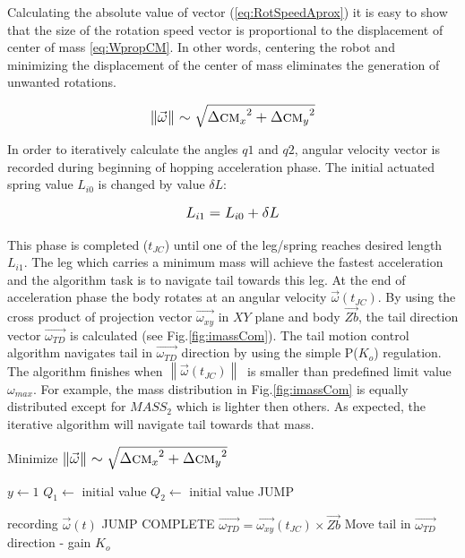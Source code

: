Calculating the absolute value of vector (\ref{eq:RotSpeedAprox}) it is easy to show that the size of the rotation speed vector is proportional to the displacement of center of mass \eqref{eq:WpropCM}. In other words, centering the robot and minimizing the displacement of the center of mass eliminates the generation of unwanted rotations. 

\begin{equation}\label{eq:WpropCM}
\left \| \vec{\omega} \right \|\sim \sqrt{{\Delta \textsc{cm}_x}^2+{\Delta \textsc{cm}_y}^2}
\end{equation}


In order to iteratively calculate the angles $q1$ and $q2$, angular velocity vector is recorded during beginning of hopping acceleration phase. The initial actuated spring value $L_{i0}$ is changed by value $\delta L$:

\begin{equation}
\tiny
L_{i1}=L_{i0}+\delta L
\normalsize
\end{equation}  

This phase is completed ($t_{JC}$) until one of the leg/spring reaches desired length $L_{i1}$. The leg which carries a minimum mass will achieve the fastest acceleration and the algorithm task is to navigate tail towards this leg. At the end of acceleration phase the body rotates at an angular velocity $\vec{\omega}(t_{JC})$. By using the cross product of projection vector $\vec{\omega_{xy}}$ in $XY$ plane and body $\vec{Zb}$, the tail direction vector $\vec{\omega_{TD}}$ is calculated (see Fig.\ref{fig:imassCom}). The tail motion control algorithm navigates tail in $\vec{\omega_{TD}}$ direction by using the simple P($K_o$) regulation. The algorithm finishes when $\left \| \vec{\omega}(t_{JC}) \right \|\ $ is smaller than predefined limit value $\omega_{max}$.  For example, the mass distribution in Fig.\ref{fig:imassCom} is equally distributed except for $MASS_2$  which is lighter then others. As expected, the iterative algorithm will navigate tail towards that mass.



\begin{algorithm}
\caption{Minimize $\left \| \vec{\omega} \right \|\sim \sqrt{{\Delta \textsc{cm}_x}^2+{\Delta \textsc{cm}_y}^2}$}
\begin{algorithmic} 
\STATE $y \leftarrow 1$
\REPEAT
\STATE $Q_1 \leftarrow$ initial value
\STATE $Q_2 \leftarrow$ initial value
\STATE JUMP

\REPEAT
\STATE recording $\vec{\omega}(t)$
\UNTIL JUMP COMPLETE
\STATE $\vec{\omega_{TD}} = \vec{\omega_{xy}}(t_{JC}) \times \vec{Zb}$
\STATE Move tail in $\vec{\omega_{TD}}$ direction - gain $K_o$
\end{algorithmic}
\end{algorithm}


